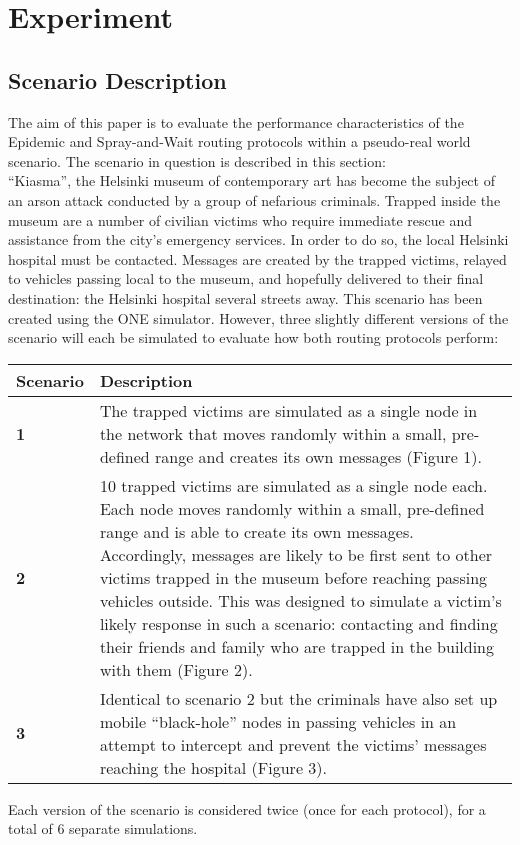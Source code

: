 \documentclass{article}
\begin{document}
\section{Experiment}
\subsection{Scenario Description}
The aim of this paper is to evaluate the performance characteristics of the Epidemic and Spray-and-Wait routing protocols within a pseudo-real world scenario. The scenario in question is described in this section:\\
\newline ``Kiasma'', the Helsinki museum of contemporary art has become the subject of an arson attack conducted by a group of nefarious criminals. Trapped inside the museum are a number of civilian victims who require immediate rescue and assistance from the city's emergency services. In order to do so, the local Helsinki hospital must be contacted. Messages are created by the trapped victims, relayed to vehicles passing local to the museum, and hopefully delivered to their final destination: the Helsinki hospital several streets away.
This scenario has been created using the ONE simulator. However, three slightly different versions of the scenario will each be simulated to evaluate how both routing protocols perform:

\begin{center}
\begin{tabular}{|l|p{13cm}|}
\hline
\textbf{Scenario} & \textbf{Description} \\ \hline
\textbf{1} & The trapped victims are simulated as a single node in the network that moves randomly within a small, pre-defined range and creates its own messages (Figure 1). \\ \hline
\textbf{2} & 10 trapped victims are simulated as a single node each. Each node moves randomly within a small, pre-defined range and is able to create its own messages. Accordingly, messages are likely to be first sent to other victims trapped in the museum before reaching passing vehicles outside. This was designed to simulate a victim's likely response in such a scenario: contacting and finding their friends and family who are trapped in the building with them (Figure 2). \\ \hline
\textbf{3} & Identical to scenario 2 but the criminals have also set up mobile ``black-hole'' nodes in passing vehicles in an attempt to intercept and prevent the victims' messages reaching the hospital (Figure 3). \\ \hline
\end{tabular}
\end{center}
\newline Each version of the scenario is considered twice (once for each protocol), for a total of 6 separate simulations.
\end{document}
